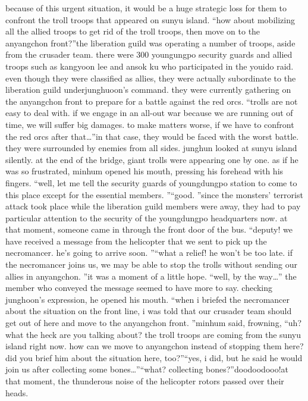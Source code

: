 because of this urgent situation, it would be a huge strategic loss for them to confront the troll troops that appeared on sunyu island.
“how about mobilizing all the allied troops to get rid of the troll troops, then move on to the anyangchon front?”the liberation guild was operating a number of troops, aside from the crusader team.
 there were 300 youngungpo security guards and allied troops such as kangyoon lee and ansok ku who participated in the youido raid.
even though they were classified as allies, they were actually subordinate to the liberation guild underjunghuoon’s command.
 they were currently gathering on the anyangchon front to prepare for a battle against the red orcs.
“trolls are not easy to deal with.
 if we engage in an all-out war because we are running out of time, we will suffer big damages.
 to make matters worse, if we have to confront the red orcs after that…”in that case, they would be faced with the worst battle.
 they were surrounded by enemies from all sides.
junghun looked at sunyu island silently.
 at the end of the bridge, giant trolls were appearing one by one.
 as if he was so frustrated, minhum opened his mouth, pressing his forehead with his fingers.
“well, let me tell the security guards of youngdungpo station to come to this place except for the essential members.
”“good.
”since the monsters’ terrorist attack took place while the liberation guild members were away, they had to pay particular attention to the security of the youngdungpo headquarters now.
at that moment, someone came in through the front door of the bus.
“deputy! we have received a message from the helicopter that we sent to pick up the necromancer.
 he’s going to arrive soon.
”“what a relief! he won’t be too late.
 if the necromancer joins us, we may be able to stop the trolls without sending our allies in anyangchon.
”it was a moment of a little hope.
“well, by the way…”
the member who conveyed the message seemed to have more to say.
checking junghoon’s expression, he opened his mouth.
“when i briefed the necromancer about the situation on the front line, i was told that our crusader team should get out of here and move to the anyangchon front.
”minhum said, frowning, “uh? what the heck are you talking about? the troll troops are coming from the sunyu island right now.
 how can we move to anyangchon instead of stopping them here? did you brief him about the situation here, too?”“yes, i did, but he said he would join us after collecting some bones…”“what? collecting bones?”doodoodooo!at that moment, the thunderous noise of the helicopter rotors passed over their heads.
